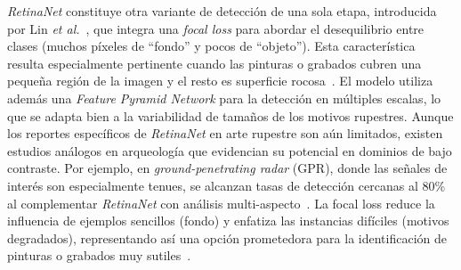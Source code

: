 \textit{RetinaNet} constituye otra variante de detección de una sola etapa, introducida por Lin \textit{et al.}~\cite{lin2017focal}, que integra una \textit{focal loss} para abordar el desequilibrio entre clases (muchos píxeles de “fondo” y pocos de “objeto”). Esta característica resulta especialmente pertinente cuando las pinturas o grabados cubren una pequeña región de la imagen y el resto es superficie rocosa~\cite{sharp2024}.
El modelo utiliza además una \textit{Feature Pyramid Network} para la detección en múltiples escalas, lo que se adapta bien a la variabilidad de tamaños de los motivos rupestres. Aunque los reportes específicos de \textit{RetinaNet} en arte rupestre son aún limitados, existen estudios análogos en arqueología que evidencian su potencial en dominios de bajo contraste. Por ejemplo, en \textit{ground-penetrating radar} (GPR), donde las señales de interés son especialmente tenues, se alcanzan tasas de detección cercanas al 80\% al complementar \textit{RetinaNet} con análisis multi-aspecto~\cite{esri_retinanet}. La focal loss reduce la influencia de ejemplos sencillos (fondo) y enfatiza las instancias difíciles (motivos degradados), representando así una opción prometedora para la identificación de pinturas o grabados muy sutiles~\cite{wunderlich2023}.

